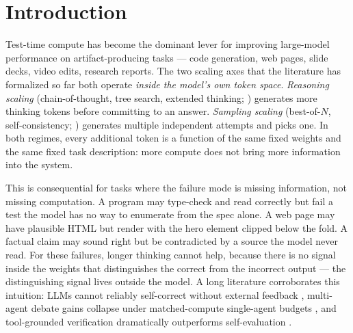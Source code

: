 \documentclass[11pt]{article}
\begin{document}
\begin{abstract}
only). The effect replicates across model families (Sonnet 4 $+33.3$\,pp, Qwen3-235B $+26.7$\,pp, GPT-5 $+13.3$\,pp on a higher single-shot baseline) and to held-out tasks ($90.6 \to 100\%$, $3/3$ failures recovered, zero regressions); the optimal token allocation is propose-heavy and the allocation simplex shows an 86.6\,pp spread. We additionally show a recipe for \emph{internalizing} the harness's interaction-quality behavior into an 8B student via SFT on judge-filtered teacher trajectories: $0.50\times$ teacher mean@1 capability on a 44-task out-of-distribution suite (rising to $0.70\times$ at pass@2), and 44\,\%/56\,\% pass@1/pass@3 on an 18-task hard held-out suite, at $\sim$10$\times$ lower deployment cost than running the harness over a frontier model. Interaction scaling is real, distinct from reasoning and sampling scaling, predictable from the taxonomy, and operational both as scaffolding and (partially) as distilled behavior.
\end{abstract}

\section{Introduction}
\label{sec:intro}

Test-time compute has become the dominant lever for improving large-model performance on artifact-producing tasks --- code generation, web pages, slide decks, video edits, research reports. The two scaling axes that the literature has formalized so far both operate \emph{inside the model's own token space}. \emph{Reasoning scaling} (chain-of-thought, tree search, extended thinking; \citealp{wei2022chain,yao2023tree,deepseek2025r1,kimi2025k15,snell2024scaling}) generates more thinking tokens before committing to an answer. \emph{Sampling scaling} (best-of-$N$, self-consistency; \citealp{wang2023selfconsistency,brown2024large}) generates multiple independent attempts and picks one. In both regimes, every additional token is a function of the same fixed weights and the same fixed task description: more compute does not bring more information into the system.

This is consequential for tasks where the failure mode is missing information, not missing computation. A program may type-check and read correctly but fail a test the model has no way to enumerate from the spec alone. A web page may have plausible HTML but render with the hero element clipped below the fold. A factual claim may sound right but be contradicted by a source the model never read. For these failures, longer thinking cannot help, because there is no signal inside the weights that distinguishes the correct from the incorrect output --- the distinguishing signal lives outside the model. A long literature corroborates this intuition: LLMs cannot reliably self-correct without external feedback \citep{huang2024selfcorrect,kamoi2025correct}, multi-agent debate gains collapse under matched-compute single-agent budgets \citep{trankiela2026singleagent}, and tool-grounded verification dramatically outperforms self-evaluation \citep{gou2024critic}.
\end{document}
